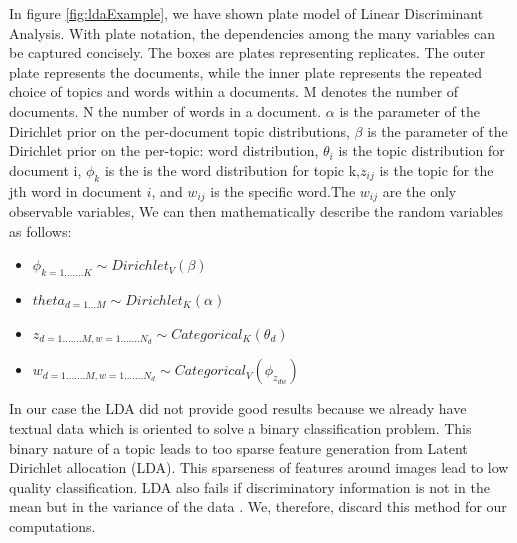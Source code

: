 In figure \ref{fig:ldaExample}, we have shown plate model of Linear Discriminant Analysis. With plate notation, the dependencies among the many variables can be captured concisely. The boxes are plates representing replicates. The outer plate represents the documents, while the inner plate represents the repeated choice of topics and words within a documents. M denotes the number of documents. N the number of words in a document. $\alpha$ is the parameter of the Dirichlet prior on the per-document topic distributions, $\beta$ is the parameter of the Dirichlet prior on the per-topic: word distribution, $\theta_i$ is the topic distribution for document i, $\phi_k$ is the is the word distribution for topic k,$z_{ij}$ is the topic for the jth word in document $i$, and $w_{ij}$ is the specific word.The $w_{ij}$ are the only observable variables, We can then mathematically describe the random variables as follows:
\begin{itemize}
\item $\phi_{k=1.......K} \sim Dirichlet_V(\beta)$\\
\item $theta_{d=1 \dots M} \sim Dirichlet_K(\alpha)$ \\
\item $z_{d=1.......M,w=1....... N_d} \sim Categorical_K(\theta_d)$ \\
\item $w_{d=1 ....... M,w=1....... N_d} \sim Categorical_V(\phi_{z_{dw}})$ \\
\end{itemize}

In our case the LDA did not provide good results because we already have textual data which is oriented to solve a binary 
classification problem. This binary nature of a topic leads to too sparse feature generation from Latent Dirichlet allocation (LDA). 
This sparseness of features around images lead to low quality classification. LDA also fails if discriminatory information is
not in the mean but in the variance of the data  \citet*{Blei}. We, therefore, discard this method for our computations.

